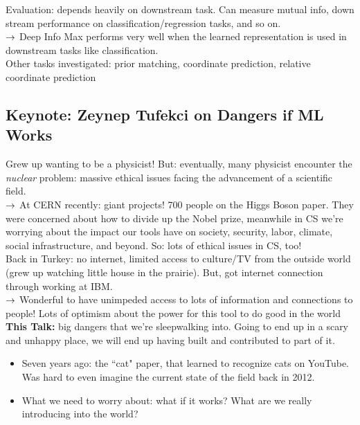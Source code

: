 Evaluation: depends heavily on downstream task. Can measure mutual info, down stream performance on classification/regression tasks, and so on. \\

$\rightarrow$ Deep Info Max performs very well when the learned representation is used in downstream tasks like classification. \\

Other tasks investigated: prior matching, coordinate prediction, relative coordinate prediction \\


\subsection{Keynote: Zeynep Tufekci on Dangers if ML Works}
\label{sec:keynote_zeynep}
Grew up wanting to be a physicist! But: eventually, many physicist encounter the {\it nuclear} problem: massive ethical issues facing the advancement of a scientific field. \\

$\rightarrow$ At CERN recently: giant projects! 700 people on the Higgs Boson paper. They were concerned about how to divide up the Nobel prize, meanwhile in CS we're worrying about the impact our tools have on society, security, labor, climate, social infrastructure, and beyond. So: lots of ethical issues in CS, too! \\

Back in Turkey: no internet, limited access to culture/TV from the outside world (grew up watching little house in the prairie). But, got internet connection through working at IBM. \\

$\rightarrow$ Wonderful to have unimpeded access to lots of information and connections to people! Lots of optimism about the power for this tool to do good in the world \\


{\bf This Talk:} big dangers that we're sleepwalking into. Going to end up in a scary and unhappy place, we will end up having built and contributed to part of it. \\
\begin{itemize}
    \item Seven years ago: the ``cat" paper, that learned to recognize cats on YouTube. Was hard to even imagine the current state of the field back in 2012.
    \item What we need to worry about: what if it works? What are we really introducing into the world?
\end{itemize}


